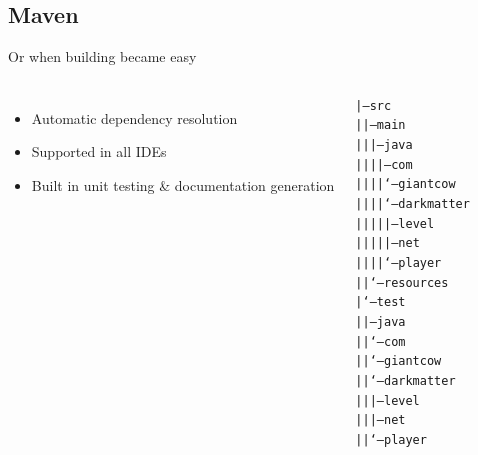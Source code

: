 \documentclass[]{beamer}
\begin{document}
\subsection{Maven}
\begin{frame}{Or when building became easy}
  \begin{columns}[c]
    \begin{itemize}
    \item Automatic dependency resolution
    \item Supported in all IDEs
    \item Built in unit testing \& documentation generation
    \end{itemize}
    \tiny
    \begin{alltt}
      |-- src                                  \\
      |   |-- main                             \\
      |   |   |-- java                         \\
      |   |   |   |-- com                      \\
      |   |   |   |   `-- giantcow             \\
      |   |   |   |       `-- darkmatter       \\
      |   |   |   |           |-- level        \\
      |   |   |   |           |-- net          \\
      |   |   |   |           `-- player       \\
      |   |   `-- resources                    \\
      |   `-- test                             \\
      |       |-- java                         \\
      |       |   `-- com                      \\
      |       |       `-- giantcow             \\
      |       |           `-- darkmatter       \\
      |       |               |-- level        \\
      |       |               |-- net          \\
      |       |               `-- player       \\
    \end{alltt}
  \end{columns}
\end{frame}
\end{document}
